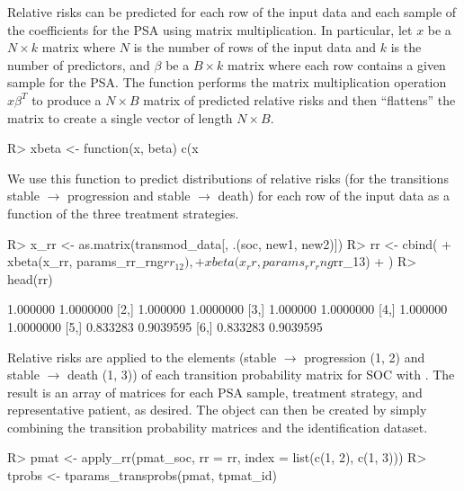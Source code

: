\documentclass[article, nojss]{jss}\usepackage[]{graphicx}\usepackage[]{color}
\begin{document}
Relative risks can be predicted for each row of the input data and each sample of the coefficients for the PSA using matrix multiplication. In particular, let $x$ be a $N \times k$ matrix where $N$ is the number of rows of the input data and $k$ is the number of predictors, and $\beta$ be a $B \times k$ matrix where each row contains a given sample for the PSA. The function  performs the matrix multiplication operation $x\beta^T$ to produce a $N \times B$ matrix of predicted relative risks and then ``flattens'' the matrix to create a single vector of length $N \times B$.

\begin{Schunk}
\begin{Sinput}
R> xbeta <- function(x, beta) c(x %
\end{Sinput}
\end{Schunk}

We use this function to predict distributions of relative risks (for the transitions stable $\rightarrow$ progression and stable $\rightarrow$ death) for each row of the input data as a function of the three treatment strategies. 

\begin{Schunk}
\begin{Sinput}
R> x_rr <- as.matrix(transmod_data[, .(soc, new1, new2)])
R> rr <- cbind(
+    xbeta(x_rr, params_rr_rng$rr_12),
+    xbeta(x_rr, params_rr_rng$rr_13)
+  )
R> head(rr) 
\end{Sinput}
\begin{Soutput}
         [,1]      [,2]
[1,] 1.000000 1.0000000
[2,] 1.000000 1.0000000
[3,] 1.000000 1.0000000
[4,] 1.000000 1.0000000
[5,] 0.833283 0.9039595
[6,] 0.833283 0.9039595
\end{Soutput}
\end{Schunk}

Relative risks are applied to the elements (stable $\rightarrow$ progression (1, 2) and stable $\rightarrow$ death (1, 3)) of each transition probability matrix for SOC with . The result is an array of matrices for each PSA sample, treatment strategy,  and representative patient, as desired. The  object can then be created by simply combining the transition probability matrices and the identification dataset. 

\begin{Schunk}
\begin{Sinput}
R> pmat <- apply_rr(pmat_soc, rr = rr, index = list(c(1, 2), c(1, 3)))
R> tprobs <- tparams_transprobs(pmat, tpmat_id)
\end{Sinput}
\end{Schunk}
\end{document}
